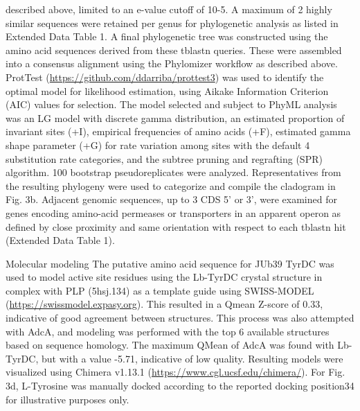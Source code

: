 \documentclass[]{article}
\begin{document}
described above, limited to an e-value cutoff of 10-5. A maximum of 2
highly similar sequences were retained per genus for phylogenetic
analysis as listed in Extended Data Table 1. A final phylogenetic tree
was constructed using the amino acid sequences derived from these
tblastn queries. These were assembled into a consensus alignment using
the Phylomizer workflow as described above. ProtTest
(\url{https://github.com/ddarriba/prottest3}) was used to identify the
optimal model for likelihood estimation, using Aikake Information
Criterion (AIC) values for selection. The model selected and subject to
PhyML analysis was an LG model with discrete gamma distribution, an
estimated proportion of invariant sites (+I), empirical frequencies of
amino acids (+F), estimated gamma shape parameter (+G) for rate
variation among sites with the default 4 substitution rate categories,
and the subtree pruning and regrafting (SPR) algorithm. 100 bootstrap
pseudoreplicates were analyzed. Representatives from the resulting
phylogeny were used to categorize and compile the cladogram in Fig. 3b.
Adjacent genomic sequences, up to 3 CDS 5' or 3', were examined for
genes encoding amino-acid permeases or transporters in an apparent
operon as defined by close proximity and same orientation with respect
to each tblastn hit (Extended Data Table 1).

Molecular modeling The putative amino acid sequence for JUb39 TyrDC was
used to model active site residues using the Lb-TyrDC crystal structure
in complex with PLP (5hsj.134) as a template guide using SWISS-MODEL
(\url{https://swissmodel.expasy.org}). This resulted in a Qmean Z-score
of 0.33, indicative of good agreement between structures. This process
was also attempted with AdcA, and modeling was performed with the top 6
available structures based on sequence homology. The maximum QMean of
AdcA was found with Lb-TyrDC, but with a value -5.71, indicative of low
quality. Resulting models were visualized using Chimera v1.13.1
(\url{https://www.cgl.ucsf.edu/chimera/}). For Fig. 3d, L-Tyrosine was
manually docked according to the reported docking position34 for
illustrative purposes only.
\end{document}
